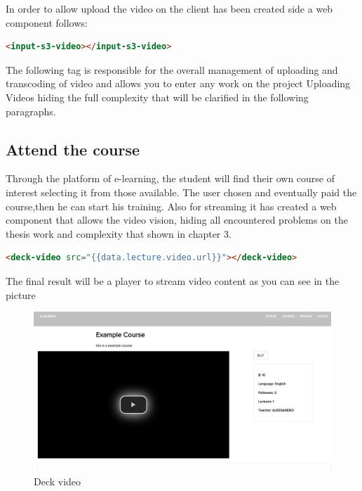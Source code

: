 In order to allow upload the video on the client has been created side a web component follows:

\begin{lstlisting}[language=html]
      <input-s3-video></input-s3-video>
\end{lstlisting}

The following tag is responsible for the overall management of uploading and transcoding of video and allows you to enter any work on the project Uploading Videos hiding the full complexity that will be clarified in the following paragraphs.

\subsection{Attend the course}
\label{sec:attend_the_course}
Through the platform of e-learning, the student will find their own course of interest selecting it from those available.
The user chosen and eventually paid the course,then he can start his training.
Also for streaming it has created a web component that allows the video vision, hiding all  encountered problems on the thesis work and complexity that shown in chapter 3.

\begin{lstlisting}[language=html]
       <deck-video src="{{data.lecture.video.url}}"></deck-video>
\end{lstlisting}

The final result will be a player to stream video content as you can see in the picture

\begin{figure}[htb]
 \centering
 \includegraphics[width=1.0\linewidth]{images/chapter6/deck_video.png}\hfill
 \caption[Deck video]{Deck video}
 \label{fig:fourV}
\end{figure}
